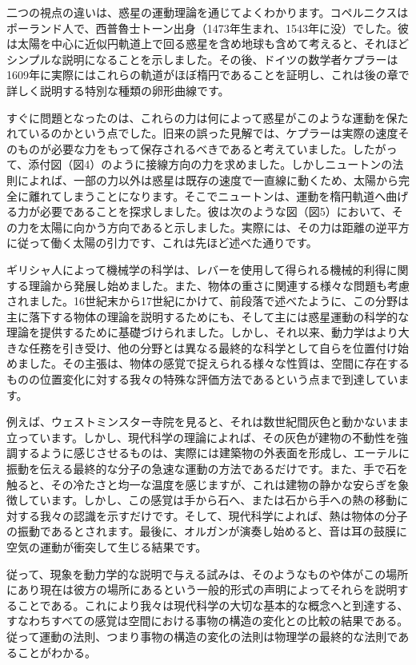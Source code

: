 \documentclass[a4paper,11pt,openany]{ltjsbook}
\begin{document}
二つの視点の違いは、惑星の運動理論を通じてよくわかります。コペルニクスはポーランド人で、西普魯士トーン出身（1473年生まれ、1543年に没）でした。彼は太陽を中心に近似円軌道上で回る惑星を含め地球も含めて考えると、それほどシンプルな説明になることを示しました。その後、ドイツの数学者ケプラーは1609年に実際にはこれらの軌道がほぼ楕円であることを証明し、これは後の章で詳しく説明する特別な種類の卵形曲線です。

すぐに問題となったのは、これらの力は何によって惑星がこのような運動を保たれているのかという点でした。旧来の誤った見解では、ケプラーは実際の速度そのものが必要な力をもって保存されるべきであると考えていました。したがって、添付図（図4）のように接線方向の力を求めました。しかしニュートンの法則によれば、一部の力以外は惑星は既存の速度で一直線に動くため、太陽から完全に離れてしまうことになります。そこでニュートンは、運動を楕円軌道へ曲げる力が必要であることを探求しました。彼は次のような図（図5）において、その力を太陽に向かう方向であると示しました。実際には、その力は距離の逆平方に従って働く太陽の引力です、これは先ほど述べた通りです。

ギリシャ人によって機械学の科学は、レバーを使用して得られる機械的利得に関する理論から発展し始めました。また、物体の重さに関連する様々な問題も考慮されました。16世紀末から17世紀にかけて、前段落で述べたように、この分野は主に落下する物体の理論を説明するためにも、そして主には惑星運動の科学的な理論を提供するために基礎づけられました。しかし、それ以来、動力学はより大きな任務を引き受け、他の分野とは異なる最終的な科学として自らを位置付け始めました。その主張は、物体の感覚で捉えられる様々な性質は、空間に存在するものの位置変化に対する我々の特殊な評価方法であるという点まで到達しています。

例えば、ウェストミンスター寺院を見ると、それは数世紀間灰色と動かないまま立っています。しかし、現代科学の理論によれば、その灰色が建物の不動性を強調するように感じさせるものは、実際には建築物の外表面を形成し、エーテルに振動を伝える最終的な分子の急速な運動の方法であるだけです。また、手で石を触ると、その冷たさと均一な温度を感じますが、これは建物の静かな安らぎを象徴しています。しかし、この感覚は手から石へ、または石から手への熱の移動に対する我々の認識を示すだけです。そして、現代科学によれば、熱は物体の分子の振動であるとされます。最後に、オルガンが演奏し始めると、音は耳の鼓膜に空気の運動が衝突して生じる結果です。

従って、現象を動力学的な説明で与える試みは、そのようなものや体がこの場所にあり現在は彼方の場所にあるという一般的形式の声明によってそれらを説明することである。これにより我々は現代科学の大切な基本的な概念へと到達する、すなわちすべての感覚は空間における事物の構造の変化との比較の結果である。従って運動の法則、つまり事物の構造の変化の法則は物理学の最終的な法則であることがわかる。
\end{document}
